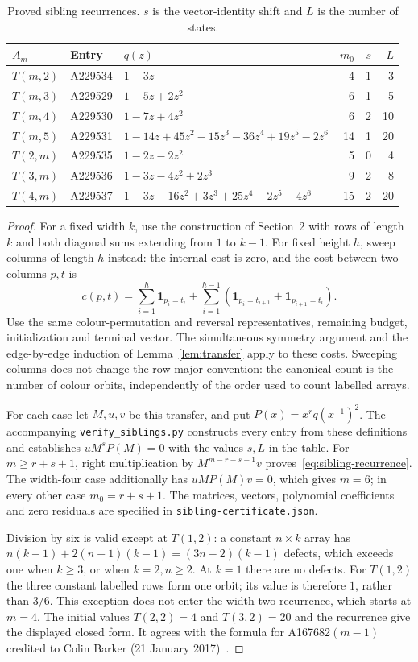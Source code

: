 \documentclass[11pt,a4paper]{article}
\newcommand{\ind}{\mathbf 1}
\begin{document}
\begin{table}[htbp]
\centering\small
\begin{tabular}{llp{}rrr}
\toprule
$A_m$ & Entry & $q(z)$ & $m_0$ & $s$ & $L$\\
\midrule
$T(m,2)$ & A229534 & $1-3z$ & 4 & 1 & 3\\
$T(m,3)$ & A229529 & $1-5z+2z^2$ & 6 & 1 & 5\\
$T(m,4)$ & A229530 & $1-7z+4z^2$ & 6 & 2 & 10\\
$T(m,5)$ & A229531 & $1-14z+45z^2-15z^3-36z^4+19z^5-2z^6$ & 14 & 1 & 20\\
$T(2,m)$ & A229535 & $1-2z-2z^2$ & 5 & 0 & 4\\
$T(3,m)$ & A229536 & $1-3z-4z^2+2z^3$ & 9 & 2 & 8\\
$T(4,m)$ & A229537 & $1-3z-16z^2+3z^3+25z^4-2z^5-4z^6$ & 15 & 2 & 20\\
\bottomrule
\end{tabular}
\caption{Proved sibling recurrences. $s$ is the vector-identity shift
and $L$ is the number of states.}\label{tab:siblings}
\end{table}

\begin{proof}
For a fixed width $k$, use the construction of Section~2 with rows of
length $k$ and both diagonal sums extending from $1$ to $k-1$.
For fixed height $h$, sweep columns of length $h$ instead: the internal
cost is zero, and the cost between two columns $p,t$ is
\[
 c(p,t)=\sum_{i=1}^h\ind_{p_i=t_i}
       +\sum_{i=1}^{h-1}(\ind_{p_i=t_{i+1}}+\ind_{p_{i+1}=t_i}).
\]
Use the same colour-permutation and reversal representatives, remaining
budget, initialization and terminal vector. The simultaneous symmetry
argument and the edge-by-edge induction of Lemma~\ref{lem:transfer}
apply to these costs. Sweeping columns does not change the
row-major convention: the canonical count is the number of colour
orbits, independently of the order used to count labelled arrays.

For each case let $M,u,v$ be this transfer, and put
$P(x)=x^r q(x^{-1})^2$. The accompanying
\texttt{verify\_siblings.py} constructs every entry from these definitions
and establishes $uM^sP(M)=0$ with the values $s,L$ in the table.
For $m\geq r+s+1$, right multiplication by
$M^{m-r-s-1}v$ proves~\eqref{eq:sibling-recurrence}.
The width-four case additionally has $uMP(M)v=0$, which gives $m=6$;
in every other case $m_0=r+s+1$.
The matrices, vectors, polynomial coefficients and zero residuals
are specified in \texttt{sibling-certificate.json}.

Division by six is valid except at $T(1,2)$:
a constant $n\times k$ array has
$n(k-1)+2(n-1)(k-1)=(3n-2)(k-1)$ defects, which exceeds one when
$k\geq3$, or when $k=2,n\geq2$. At $k=1$ there are no defects.
For $T(1,2)$ the three constant labelled rows form one orbit; its
value is therefore $1$, rather than $3/6$. This exception does not enter
the width-two recurrence, which starts at $m=4$.
The initial values $T(2,2)=4$ and $T(3,2)=20$ and the recurrence give
the displayed closed form. It agrees with the formula for
A167682$(m-1)$ credited to Colin Barker (21 January 2017)~\cite{boundary-sources}.
\end{proof}
\end{document}
